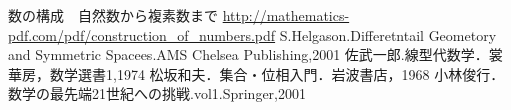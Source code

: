 \begin{thebibliography}{99}
 数の構成　自然数から複素数まで \url{http://mathematics-pdf.com/pdf/construction_of_numbers.pdf}
 S.Helgason.Differetntail Geometory and Symmetric Spacees.AMS Chelsea Publishing,2001
 佐武一郎.線型代数学．裳華房，数学選書1,1974
 松坂和夫．集合・位相入門．岩波書店，1968
 小林俊行．数学の最先端21世紀への挑戦.vol1.Springer,2001
\end{thebibliography}
